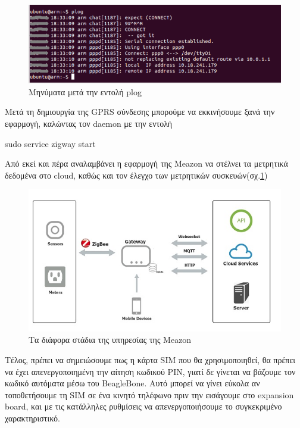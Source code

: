 \documentclass[12pt, a4paper, oneside]{report}
\begin{document}
\begin{figure}
\centering
\includegraphics[scale=0.75]{eikona_34}
\caption{Μηνύματα μετά την εντολή plog}
\end{figure}

Μετά τη δημιουργία της GPRS σύνδεσης μπορούμε να εκκινήσουμε ξανά την εφαρμογή, καλώντας τον daemon με την εντολή 
\begin{code}
sudo service zigway start
\end{code}
Από εκεί και πέρα αναλαμβάνει η εφαρμογή της Meazon\label{app} να στέλνει τα μετρητικά δεδομένα στο cloud, καθώς και τον έλεγχο των μετρητικών συσκευών(σχ.\ref{eik35})

\begin{figure}[!ht]
\centering
\includegraphics[scale=0.7]{eikona_35}
\caption[Τα διάφορα στάδια της υπηρεσίας της Meazon]{Τα διάφορα στάδια της υπηρεσίας της Meazon\cite{meazon}}\label{eik35}
\end{figure}

Τέλος, πρέπει να σημειώσουμε πως η κάρτα SIM που θα χρησιμοποιηθεί, θα πρέπει να έχει απενεργοποιημένη την αίτηση κωδικού PIN, γιατί δε γίνεται να βάζουμε τον κωδικό αυτόματα μέσω του BeagleBone. Αυτό μπορεί να γίνει εύκολα αν τοποθετήσουμε τη SIM σε ένα κινητό τηλέφωνο πριν την εισάγουμε στο expansion board, και με τις κατάλληλες ρυθμίσεις να απενεργοποιήσουμε το συγκεκριμένο χαρακτηριστικό.
\end{document}
